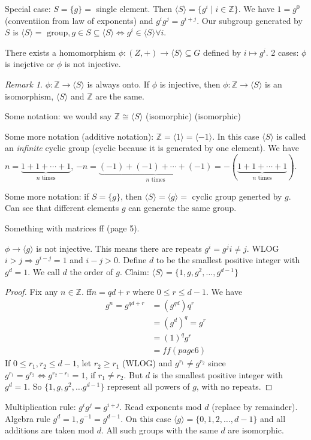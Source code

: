 \documentclass{article}
\theoremstyle{plain}
\theoremstyle{remark}
\newtheorem{remark}{Remark}
\newcommand{\Z}{{\mathbb Z}}
\begin{document}
Special case: $S = \{g\} =$ single element.
Then $\langle S \rangle = \{g^i \mid i \in \Z \}$.
We have $1 = g^0$ (conventiion from law of exponents)
and $g^ig^j = g^{i + j}$.
Our subgroup generated by $S$ is
$\langle S \rangle = \text{ group}, g \in S \subseteq \langle S \rangle
\iff g^i \in \langle S \rangle \forall i$.

There exists a homomorphism $\phi \colon (Z, +) \to
\langle S \rangle \subseteq G$
defined by $i \mapsto g^i$.
2 cases: $\phi$ is inejctive or $\phi$ is not injective.

\begin{remark}
	$\phi \colon \Z \to \langle S \rangle$ is always onto.
	If $\phi$ is injective, then $\phi \colon \Z \to \langle S \rangle$
	is an isomorphism, $\langle S \rangle$ and $\Z$ are the same.
\end{remark}
Some notation: we would say $\Z \cong \langle S \rangle$ (isomorphic) (isomorphic)

Some more notation (additive notation): $\Z = \langle 1 \rangle = \langle -1 \rangle$.
In this case $\langle S \rangle$ is called an {\it infinite} cyclic group
(cyclic because it is generated by one element).
We have $n = \underbrace{1+1+\cdots+1}_{n \text{ times}}$,
$-n = \underbrace{(-1)+(-1)+\cdots+(-1)}_{n \text{ times}}=
-(\underbrace{1+1+\cdots+1}_{n \text{ times}})$.

Some more notation: if $S = \{g\}$, then $\langle S \rangle = \langle g \rangle =$
cyclic group generted by $g$.
Can see that different elements $g$ can generate the same group.

Something with matrices ff (page 5).

$\phi \to \langle g \rangle$ is not injective.
This means there are repeats $g^i = g^j i\neq j$.
WLOG $i > j \Rightarrow g^{i-j} = 1$ and $i-j > 0$.
Define $d$ to be the smallest positive integer with $g^d = 1$.
We call $d$ the order of $g$.
Claim: $\langle S \rangle = \{1,g,g^2,\dots,g^{d-1}\}$
\begin{proof}
	Fix any $n\in\Z$.
	ff$n = qd+r$ where $0 \leq r \leq  d-1$.
	We have
	\begin{align*}
		g^n = g^{qd+r} &= (g^{qd})q^r\\
					   &= (g^d)^q = g^r\\
					   &= (1)^q g^r\\
					   &= ff (page 6)
	\end{align*}
	If $0 \leq r_1,r_2\leq d-1$,
	let $r_2 \geq r_1$ (WLOG)
	and $g^{r_1} \neq g^{r_2}$ since $g^{r_1} = g^{r_2} \iff g^{r_2-r_1} = 1$,
	if $r_1 \neq r_2$.
	But $d$ is the smallest positive integer with $g^d = 1$.
	So $\{1,g,g^2,\dots g^{d-1}\}$ represent
	all powers of $g$, with no repeats.
\end{proof}
Multiplication rule: $g^ig^j = g^{i+j}$.
Read exponents mod $d$ (replace by remainder).
Algebra rule $g^d=1, g^{-1} = g^{d-1}$.
On this case $\langle g \rangle = \{0,1,2,\dots,d-1\}$
and all additions are taken mod $d$.
All such groups with the same $d$ are isomorphic.
\end{document}
